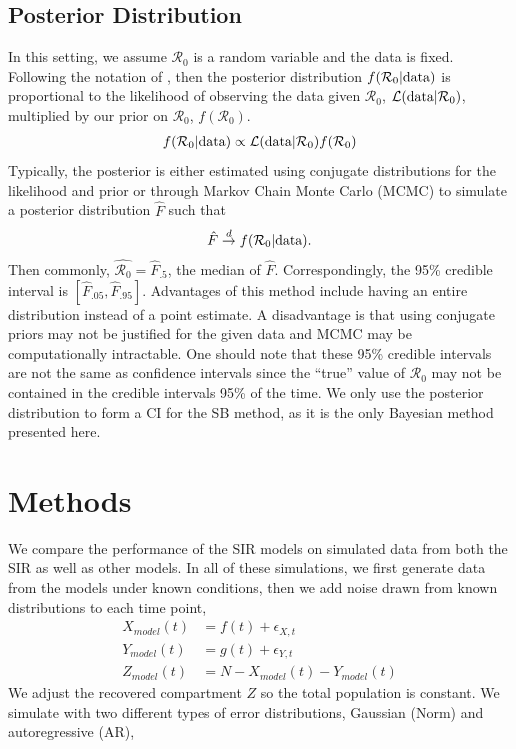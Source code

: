 \documentclass[12pt]{article}
\newcommand{\rr}{\ensuremath{\mathcal{R}_0}}
\begin{document}
\subsection{Posterior Distribution}
In this setting, we assume $\rr$ is a random variable and the data is fixed.  Following the notation of \cite{wasserman2004}, then the posterior distribution $f(\rr | \textnormal{data})$ is proportional to the likelihood of observing the data given $\rr$, $\mathcal{L}(\textnormal{data}|\rr)$, multiplied by our prior on $\rr$, $f(\rr)$. 
\begin{align*}
f(\rr | \textnormal{data} ) \propto \mathcal{L}(\textnormal{data} | \rr) f(\rr)
\end{align*}
 Typically, the posterior is either estimated using conjugate distributions for the likelihood and prior or through Markov Chain Monte Carlo (MCMC) to simulate a posterior distribution $\hat{F}$ such that
\begin{align*}
\hat{F} \overset{d}{\to} f(\rr| \textnormal{data}).
\end{align*}
Then commonly, $\hat{\rr} = \hat{F}_{.5}$, the median of $\hat{F}$.  Correspondingly, the 95\% credible interval is $\left[\hat{F}_{.05}, \hat{F}_{.95} \right ]$. Advantages of this method include having an entire distribution instead of a point estimate.  A disadvantage is that using conjugate priors may not be justified for the given data and MCMC may be computationally intractable.  One should note that these 95\% credible intervals are not the same as confidence intervals since the ``true'' value of $\rr$ may not be contained in the credible intervals 95\% of the time.  We only use the posterior distribution to form a CI for the SB method, as it is the only Bayesian method presented here.





\section{Methods}\label{sec:sim-res}

We compare the performance of the SIR models on simulated data from both the SIR as well as other models. In all of these simulations, we first generate data from the models under known conditions, then we add noise drawn from known distributions to each time point,
\begin{align}\label{eq:sim-models}
  X_{model}(t) &= f(t) + \epsilon_{X,t} \\
  Y_{model}(t) &= g(t) + \epsilon_{Y,t} \nonumber\\
  Z_{model}(t) &= N - X_{model}(t) - Y_{model}(t)\nonumber 
\end{align}
We adjust the recovered compartment $Z$ so the total population is constant. 
We simulate with two different types of error distributions, Gaussian (Norm) and autoregressive (AR),
\end{document}
